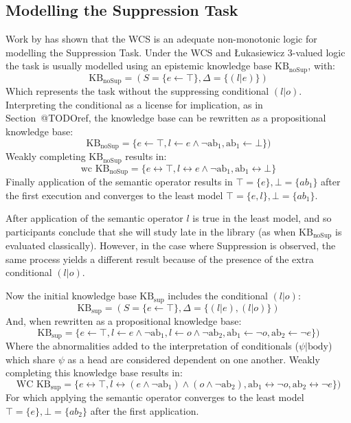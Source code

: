 \subsection{Modelling the Suppression Task} \label{ssec:sup_mod}
Work by \cite{dietz2014modeling} has shown that the WCS is an adequate non-monotonic logic for modelling the Suppression Task. Under the WCS and \L ukasiewicz 3-valued logic the task is usually modelled using an epistemic knowledge base $\text{KB}_\text{noSup}$, with:
\[\text{KB}_\text{noSup}=(S=\{e \leftarrow \top\}, \Delta=\{(l|e)\})\]
Which represents the  task without the suppressing conditional $(l|o)$. Interpreting the conditional as a license for implication, as in Section~@TODOref, the knowledge base can be rewritten as a propositional knowledge base:
\[\text{KB}_\text{noSup}=\{e \leftarrow \top, l \leftarrow e \land \lnot \text{ab}_1, \text{ab}_1\leftarrow \bot\})\]
Weakly completing $\text{KB}_\text{noSup}$ results in:
\[\text{wc KB}_\text{noSup}=\{e \leftrightarrow \top, l \leftrightarrow e \land \lnot \text{ab}_1, \text{ab}_1\leftrightarrow \bot\}\]
Finally application of the semantic operator results in $\top=\{e\}, \bot=\{ab_1\}$ after the first execution and converges to the least model $\top=\{e,l\}, \bot=\{ab_1\}$.

After application of the semantic operator $l$ is true in the least model, and so participants conclude that she will study late in the library (as when $\text{KB}_\text{noSup}$ is evaluated classically). However, in the case where Suppression is observed, the same process yields a different result because of the presence of the extra conditional $(l|o)$.

Now the initial knowledge base $\text{KB}_\text{sup}$ includes the conditional $(l|o)$:
\[\text{KB}_\text{sup}=(S=\{e \leftarrow \top\}, \Delta=\{(l|e),(l|o)\})\]
And, when rewritten as a propositional knowledge base:
\[\text{KB}_\text{sup}=\{e \leftarrow \top, l \leftarrow e \land \lnot \text{ab}_1, l \leftarrow o \land \lnot \text{ab}_2, \text{ab}_1\leftarrow \lnot o, \text{ab}_2\leftarrow \lnot e\})\]
Where the abnormalities added to the interpretation of conditionals ($\psi|\text{body}$) which share $\psi$ as a head are considered dependent on one another. Weakly completing this knowledge base results in:
\[\text{WC KB}_\text{sup}=\{e \leftrightarrow \top, l \leftrightarrow (e \land \lnot \text{ab}_1) \land (o \land \lnot \text{ab}_2), \text{ab}_1\leftrightarrow \lnot o, \text{ab}_2\leftrightarrow \lnot e\})\]
For which applying the semantic operator converges to the least model $\top=\{e\},\bot=\{ab_2\}$ after the first application.

